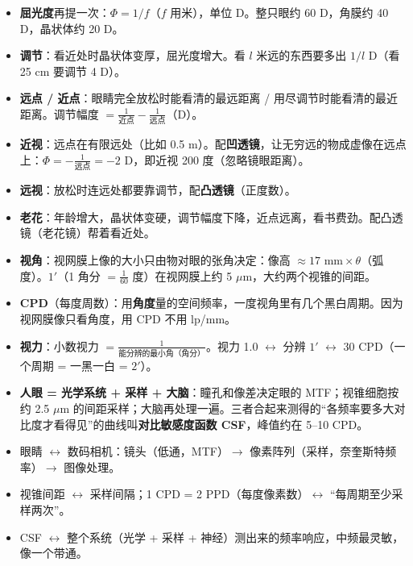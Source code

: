 \begin{itemize}
\item \textbf{屈光度}再提一次：$\Phi=1/f$（$f$ 用米），单位 D。整只眼约 60 D，角膜约 40 D，晶状体约 20 D。
\item \textbf{调节}：看近处时晶状体变厚，屈光度增大。看 $l$ 米远的东西要多出 $1/l$ D（看 25 cm 要调节 4 D）。
\item \textbf{远点 / 近点}：眼睛完全放松时能看清的最远距离 / 用尽调节时能看清的最近距离。调节幅度 $=\frac1{\text{近点}}-\frac1{\text{远点}}$（D）。
\item \textbf{近视}：远点在有限远处（比如 0.5 m）。配\textbf{凹透镜}，让无穷远的物成虚像在远点上：$\Phi=-\frac{1}{\text{远点}}=-2$ D，即近视 200 度（忽略镜眼距离）。
\item \textbf{远视}：放松时连远处都要靠调节，配\textbf{凸透镜}（正度数）。
\item \textbf{老花}：年龄增大，晶状体变硬，调节幅度下降，近点远离，看书费劲。配凸透镜（老花镜）帮着看近处。
\item \textbf{视角}：视网膜上像的大小只由物对眼的张角决定：像高 $\approx17\text{ mm}\times\theta$（弧度）。$1'$（1 角分 $=\frac1{60}$ 度）在视网膜上约 5 $\mu$m，大约两个视锥的间距。
\item \textbf{CPD}（每度周数）：用\textbf{角度}量的空间频率，一度视角里有几个黑白周期。因为视网膜像只看角度，用 CPD 不用 lp/mm。
\item \textbf{视力}：小数视力 $=\frac{1}{\text{能分辨的最小角（角分）}}$。视力 1.0 $\leftrightarrow$ 分辨 $1'$ $\leftrightarrow$ 30 CPD（一个周期 = 一黑一白 = $2'$）。
\item \textbf{人眼 = 光学系统 + 采样 + 大脑}：瞳孔和像差决定眼的 MTF；视锥细胞按约 2.5 $\mu$m 的间距采样；大脑再处理一遍。三者合起来测得的“各频率要多大对比度才看得见”的曲线叫\textbf{对比敏感度函数 CSF}，峰值约在 5–10 CPD。
\end{itemize}

\begin{idea}[类比]
\begin{itemize}
\item 眼睛 $\leftrightarrow$ 数码相机：镜头（低通，MTF）$\to$ 像素阵列（采样，奈奎斯特频率）$\to$ 图像处理。
\item 视锥间距 $\leftrightarrow$ 采样间隔；1 CPD = 2 PPD（每度像素数）$\leftrightarrow$ “每周期至少采样两次”。
\item CSF $\leftrightarrow$ 整个系统（光学 + 采样 + 神经）测出来的频率响应，中频最灵敏，像一个带通。
\end{itemize}
\end{idea}

